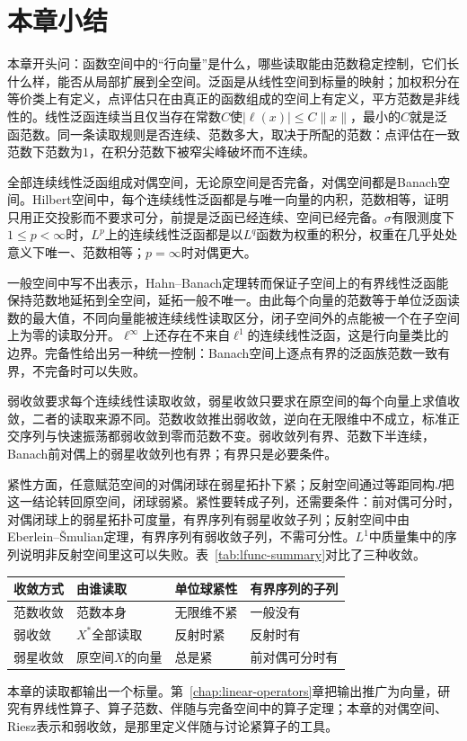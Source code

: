 \section{本章小结}
\label{sec:lfunc-summary}

本章开头问：函数空间中的“行向量”是什么，哪些读取能由范数稳定控制，它们长什么样，能否从局部扩展到全空间。泛函是从线性空间到标量的映射；加权积分在等价类上有定义，点评估只在由真正的函数组成的空间上有定义，平方范数是非线性的。线性泛函连续当且仅当存在常数$C$使$\lvert\ell(x)\rvert\leq C\lVert x\rVert$，最小的$C$就是泛函范数。同一条读取规则是否连续、范数多大，取决于所配的范数：点评估在一致范数下范数为$1$，在积分范数下被窄尖峰破坏而不连续。

全部连续线性泛函组成对偶空间，无论原空间是否完备，对偶空间都是Banach空间。Hilbert空间中，每个连续线性泛函都是与唯一向量的内积，范数相等，证明只用正交投影而不要求可分，前提是泛函已经连续、空间已经完备。$\sigma$有限测度下$1\leq p<\infty$时，$L^p$上的连续线性泛函都是以$L^q$函数为权重的积分，权重在几乎处处意义下唯一、范数相等；$p=\infty$时对偶更大。

一般空间中写不出表示，Hahn--Banach定理转而保证子空间上的有界线性泛函能保持范数地延拓到全空间，延拓一般不唯一。由此每个向量的范数等于单位泛函读数的最大值，不同向量能被连续线性读取区分，闭子空间外的点能被一个在子空间上为零的读取分开。$\ell^\infty$上还存在不来自$\ell^1$的连续线性泛函，这是行向量类比的边界。完备性给出另一种统一控制：Banach空间上逐点有界的泛函族范数一致有界，不完备时可以失败。

弱收敛要求每个连续线性读取收敛，弱星收敛只要求在原空间的每个向量上求值收敛，二者的读取来源不同。范数收敛推出弱收敛，逆向在无限维中不成立，标准正交序列与快速振荡都弱收敛到零而范数不变。弱收敛列有界、范数下半连续，Banach前对偶上的弱星收敛列也有界；有界只是必要条件。

紧性方面，任意赋范空间的对偶闭球在弱星拓扑下紧；反射空间通过等距同构$J$把这一结论转回原空间，闭球弱紧。紧性要转成子列，还需要条件：前对偶可分时，对偶闭球上的弱星拓扑可度量，有界序列有弱星收敛子列；反射空间中由Eberlein--\v{S}mulian定理，有界序列有弱收敛子列，不需可分性。$L^1$中质量集中的序列说明非反射空间里这可以失败。表~\ref{tab:lfunc-summary}对比了三种收敛。

\begin{BookInlineTable}
  \centering
  \begin{tabular}{@{}llll@{}}
    \toprule
    收敛方式 & 由谁读取 & 单位球紧性 & 有界序列的子列\\
    \midrule
    范数收敛 & 范数本身 & 无限维不紧 & 一般没有\\
    弱收敛 & $X^*$全部读取 & 反射时紧 & 反射时有\\
    弱星收敛 & 原空间$X$的向量 & 总是紧 & 前对偶可分时有\\
    \bottomrule
  \end{tabular}
  \caption{三种收敛的读取来源与紧性。第三行的单位球指$B_{X^*}$。}
  \label{tab:lfunc-summary}
\end{BookInlineTable}

本章的读取都输出一个标量。第~\ref{chap:linear-operators}章把输出推广为向量，研究有界线性算子、算子范数、伴随与完备空间中的算子定理；本章的对偶空间、Riesz表示和弱收敛，是那里定义伴随与讨论紧算子的工具。
